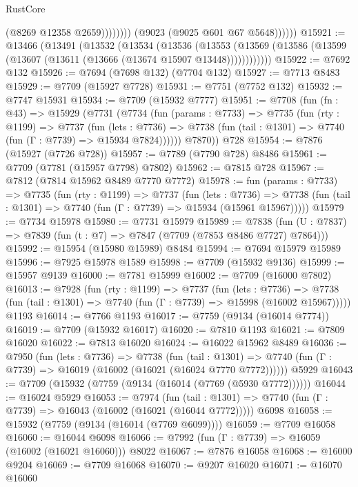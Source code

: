 \begin{lexlean}{RustCore}
\begin{coremodule}
                          (@8269 @12358 @2659))))))))
            (@9023 (@9025 @601 @67 @5648))))))
@15921 := @13466
    (@13491
      (@13532
        (@13534
          (@13536
            (@13553
              (@13569 (@13586 (@13599 (@13607 (@13611 (@13666 (@13674 @15907 @13448))))))))))))
@15922 := @7692 @132
@15926 := @7694 (@7698 @132) (@7704 @132)
@15927 := @7713 @8483
@15929 := @7709 (@15927 @7728)
@15931 := @7751 (@7752 @132)
@15932 := @7747 @15931
@15934 := @7709 (@15932 @7777)
@15951 := @7708
    (fun (fn : @43) =>
    @15929
      (@7731
        (@7734
          (fun (params : @7733) =>
          @7735
            (fun (rty : @1199) =>
            @7737
              (fun (lets : @7736) =>
              @7738 (fun (tail : @1301) => @7740 (fun (Γ : @7739) => @15934 @7824))))))
        @7870))
    @728
@15954 := @7876 (@15927 (@7726 @728))
@15957 := @7789 (@7790 @728) @8486
@15961 := @7709 (@7781 (@15957 @7798) @7802)
@15962 := @7815 @728
@15967 := @7812 (@7814 @15962 @8489 @7770 @7772)
@15978 := fun (params : @7733) =>
  @7735
    (fun (rty : @1199) =>
    @7737
      (fun (lets : @7736) =>
      @7738 (fun (tail : @1301) => @7740 (fun (Γ : @7739) => @15934 (@15961 @15967)))))
@15979 := @7734 @15978
@15980 := @7731 @15979
@15989 := @7838 (fun (U : @7837) => @7839 (fun (t : @7) => @7847 (@7709 (@7853 @8486 @7727) @7864)))
@15992 := @15954 (@15980 @15989) @8484
@15994 := @7694 @15979 @15989
@15996 := @7925 @15978 @1589
@15998 := @7709 (@15932 @9136)
@15999 := @15957 @9139
@16000 := @7781 @15999
@16002 := @7709 (@16000 @7802)
@16013 := @7928
    (fun (rty : @1199) =>
    @7737
      (fun (lets : @7736) =>
      @7738 (fun (tail : @1301) => @7740 (fun (Γ : @7739) => @15998 (@16002 @15967)))))
    @1193
@16014 := @7766 @1193
@16017 := @7759 (@9134 (@16014 @7774))
@16019 := @7709 (@15932 @16017)
@16020 := @7810 @1193
@16021 := @7809 @16020
@16022 := @7813 @16020
@16024 := @16022 @15962 @8489
@16036 := @7950
    (fun (lets : @7736) =>
    @7738
      (fun (tail : @1301) =>
      @7740 (fun (Γ : @7739) => @16019 (@16002 (@16021 (@16024 @7770 @7772))))))
    @5929
@16043 := @7709 (@15932 (@7759 (@9134 (@16014 (@7769 (@5930 @7772))))))
@16044 := @16024 @5929
@16053 := @7974
    (fun (tail : @1301) => @7740 (fun (Γ : @7739) => @16043 (@16002 (@16021 (@16044 @7772)))))
    @6098
@16058 := @15932 (@7759 (@9134 (@16014 (@7769 @6099))))
@16059 := @7709 @16058
@16060 := @16044 @6098
@16066 := @7992 (fun (Γ : @7739) => @16059 (@16002 (@16021 @16060))) @8022
@16067 := @7876 @16058
@16068 := @16000 @9204
@16069 := @7709 @16068
@16070 := @9207 @16020
@16071 := @16070 @16060

\end{coremodule}
\end{lexlean}

